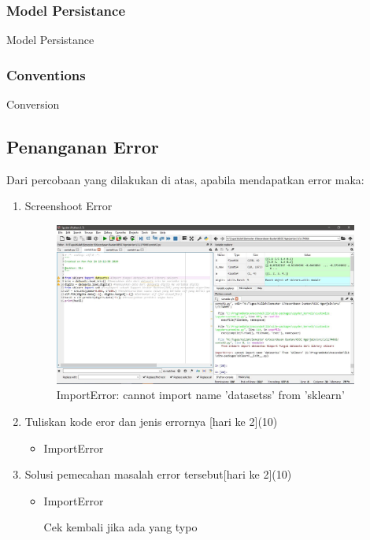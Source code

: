 \subsubsection{Model Persistance}
Model Persistance



\subsubsection{Conventions}
Conversion


\subsection{Penanganan Error}

Dari percobaan yang dilakukan di atas, apabila mendapatkan error maka:
\begin{enumerate}

\item Screenshoot Error
\begin{figure}[H]
	\begin{center}
   	 \includegraphics[width=10cm]{figures/1174083/figures1/error1.jpg}
   	 \caption{ImportError: cannot import name 'datasetss' from 'sklearn'}	
	\end{center}
\end{figure}
	
\item Tuliskan kode eror dan jenis errornya [hari ke 2](10)
\begin{itemize}
\item ImportError
\end{itemize}

\item Solusi pemecahan masalah error tersebut[hari ke 2](10)
\begin{itemize}
\item ImportError

Cek kembali jika ada yang typo
\end{itemize}

\end{enumerate}

